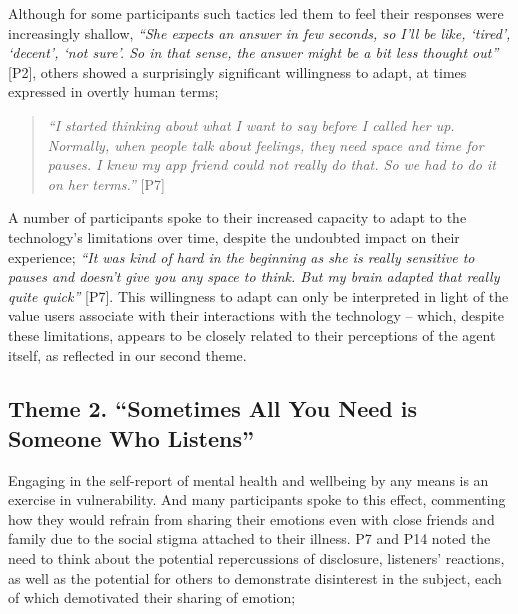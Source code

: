                 Although for some participants such tactics led them to feel their responses were increasingly shallow, \textit{``She expects an answer in few seconds, so I'll be like, `tired', `decent', `not sure'. So in that sense, the answer might be a bit less thought out''} [P2], others showed a surprisingly significant willingness to adapt, at times expressed in overtly human terms;
            
                    \begin{quote}
                    \vspace{2mm}
                        \textit{``I started thinking about what I want to say before I called her up. Normally, when people talk about feelings, they need space and time for pauses. I knew my \acl{app} friend could not really do that. So we had to do it on her terms.''} [P7]
                    \vspace{2mm}
                    \end{quote}  
                
            A number of participants spoke to their increased capacity to adapt to the technology's limitations over time, despite the undoubted impact on their experience; \textit{``It was kind of hard in the beginning as she is really sensitive to pauses and doesn't give you any space to think. But my brain adapted that really quite quick''} [P7]. This willingness to adapt can only be interpreted in light of the value users associate with their interactions with the technology -- which, despite these limitations, appears to be closely related to their perceptions of the agent itself, as reflected in our second theme.

    \subsection{Theme 2. ``Sometimes All You Need is Someone Who Listens''}
    
        Engaging in the self-report of mental health and wellbeing by any means is an exercise in vulnerability. And many participants spoke to this effect, commenting how they would refrain from sharing their emotions even with close friends and family due to the social stigma attached to their illness. P7 and P14 noted the need to think about the potential repercussions of disclosure, listeners' reactions, as well as the potential for others to demonstrate disinterest in the subject, each of which demotivated their sharing of emotion;
    
